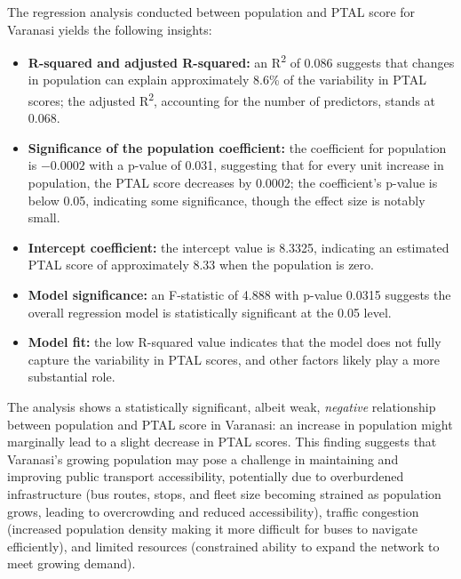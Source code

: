 \documentclass[11pt]{article}
\begin{document}
The regression analysis conducted between population and PTAL score for Varanasi yields the
following insights:
\begin{itemize}
  \item \textbf{R-squared and adjusted R-squared:} an R\textsuperscript{2} of 0.086 suggests
  that changes in population can explain approximately 8.6\% of the variability in PTAL scores;
  the adjusted R\textsuperscript{2}, accounting for the number of predictors, stands at 0.068.
  \item \textbf{Significance of the population coefficient:} the coefficient for population is
  $-0.0002$ with a p-value of 0.031, suggesting that for every unit increase in population, the
  PTAL score decreases by 0.0002; the coefficient's p-value is below 0.05, indicating some
  significance, though the effect size is notably small.
  \item \textbf{Intercept coefficient:} the intercept value is 8.3325, indicating an estimated
  PTAL score of approximately 8.33 when the population is zero.
  \item \textbf{Model significance:} an F-statistic of 4.888 with p-value 0.0315 suggests the
  overall regression model is statistically significant at the 0.05 level.
  \item \textbf{Model fit:} the low R-squared value indicates that the model does not fully
  capture the variability in PTAL scores, and other factors likely play a more substantial role.
\end{itemize}

The analysis shows a statistically significant, albeit weak, \emph{negative} relationship
between population and PTAL score in Varanasi: an increase in population might marginally lead
to a slight decrease in PTAL scores. This finding suggests that Varanasi's growing population may
pose a challenge in maintaining and improving public transport accessibility, potentially due to
overburdened infrastructure (bus routes, stops, and fleet size becoming strained as population
grows, leading to overcrowding and reduced accessibility), traffic congestion (increased
population density making it more difficult for buses to navigate efficiently), and limited
resources (constrained ability to expand the network to meet growing demand).
\end{document}
